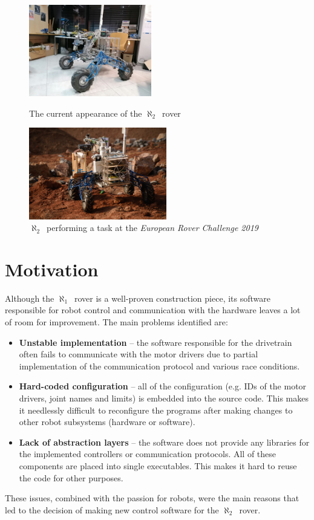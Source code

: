 \documentclass[english,inz,shortabstract]{iithesis}
\newcommand{\oldrovername}{$\aleph_1$\ }
\newcommand{\rovername}{$\aleph_2$\ }
\begin{document}
\begin{figure}[ht]
    \hspace*{\fill}
    \begin{minipage}{.45\textwidth}
      \centering
      \includegraphics[height=4cm]{img/lazik1.jpg}
      \caption{The current appearance of the \rovername rover}
      \label{fig:lazik1}
    \end{minipage}
    \hfill
    \begin{minipage}{.45\textwidth}
      \centering
      \includegraphics[height=4cm]{img/lazik2.jpg}
      \caption{\rovername performing a task at the \textit{European Rover Challenge 2019}}
      \label{fig:lazik2}
    \end{minipage}
    \hspace*{\fill}
\end{figure}

\section{Motivation}
Although the \oldrovername rover is a well-proven construction piece, its software responsible for robot control and communication with the hardware leaves a lot of room for improvement. The main problems identified are:
\begin{itemize}
    \item \textbf{Unstable implementation} -- the software responsible for the drivetrain often fails to communicate with the motor drivers due to  partial implementation of the communication protocol and various race conditions.
    \item \textbf{Hard-coded configuration} -- all of the configuration (e.g. IDs of the motor drivers, joint names and limits) is embedded into the source code. This makes it needlessly difficult to reconfigure the programs after making changes to other robot subsystems (hardware or software).
    \item \textbf{Lack of abstraction layers} -- the software does not provide any libraries for the implemented controllers or communication protocols. All of these components are placed into single executables. This makes it hard to reuse the code for other purposes.
\end{itemize}
These issues, combined with the passion for robots, were the main reasons that led to the decision of making new control software for the \rovername rover.
\end{document}

